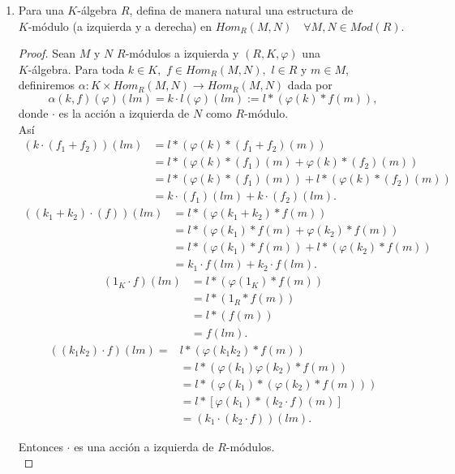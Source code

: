 \documentclass{article}
\theoremstyle{definition}
\theoremstyle{plain}
\theoremstyle{plain}
\theoremstyle{definition}
\theoremstyle{definition}
\theoremstyle{definition}
\theoremstyle{definition}
\theoremstyle{definition}
\theoremstyle{definition}
\begin{document}
\begin{enumerate}[label=\textbf{Ej \arabic*.}]
\item Para una $K$-álgebra $R$, defina de manera natural una estructura de \\ $K$-módulo (a izquierda y a derecha)
en $Hom_R(M,N)\quad \forall M,N\in Mod(R).$
\begin{proof}
	Sean $M$ y $N$ $R$-módulos a izquierda y $(R,K,\varphi)$ una \\
	$K$-álgebra. Para toda $k\in K,\,\, f\in Hom_R(M,N),\,\, l\in R$ y $m\in M$, definiremos 
	$\alpha:K\times Hom_R(M,N)\longrightarrow Hom_R(M,N)$ dada por 
	\[\alpha(k,f)(\varphi)(lm)=k\cdot l(\varphi)(lm):=l*(\varphi(k)*f(m)),\]
	donde $\cdot$ es la acción a izquierda de $N$ como $R$-módulo.\\
	Así \\
	\begin{align*}
		( k\cdot(f_1+f_2))(lm)
		&=l*(\varphi(k)*(f_1+f_2)(m))\\
		&=l*(\varphi(k)*(f_1)(m)+\varphi(k)*(f_2)(m))\\
		&=l*(\varphi(k)*(f_1)(m))+l*(\varphi(k)*(f_2)(m))\\
		&=k\cdot(f_1)(lm)+k\cdot(f_2)(lm). 
	\end{align*}
	\begin{align*}
		((k_1+k_2)\cdot(f))(lm)
		&=l*(\varphi(k_1+k_2)*f(m))\\
		&=l*(\varphi(k_1)*f(m)+\varphi(k_2)*f(m))\\
		&=l*(\varphi(k_1)*f(m))+l*(\varphi(k_2)*f(m))\\
		&=k_1\cdot f(lm)+k_2\cdot f(lm).
	\end{align*}
	\begin{align*}
		(1_K\cdot f)(lm)&=l*(\varphi(1_K)*f(m))\\
		&=l*(1_R*f(m))\\
		&=l*(f(m))\\
		&=f(lm).
	\end{align*}
	\begin{align*}
		((k_1k_2)\cdot f)(lm)=&l*(\varphi(k_1k_2)*f(m))\\
		&=l*(\varphi(k_1)\varphi(k_2)*f(m))\\
		&=l*(\varphi(k_1)*(\varphi(k_2)*f(m)))\\
		&=l*[\varphi(k_1)*(k_2\cdot f)(m)]\\
		&=(k_1\cdot(k_2\cdot f))(lm).
	\end{align*}
	
	Entonces $\cdot$ es una acción a izquierda de $R$-módulos.\\
	

\end{proof}
\end{enumerate}
\end{document}
